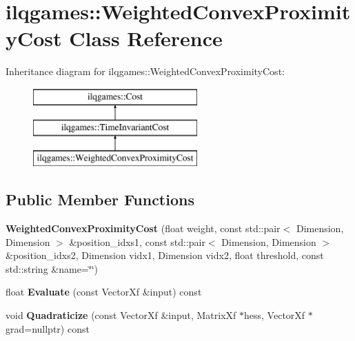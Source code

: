 \hypertarget{classilqgames_1_1_weighted_convex_proximity_cost}{}\section{ilqgames\+:\+:Weighted\+Convex\+Proximity\+Cost Class Reference}
\label{classilqgames_1_1_weighted_convex_proximity_cost}
Inheritance diagram for ilqgames\+:\+:Weighted\+Convex\+Proximity\+Cost\+:\begin{figure}[H]
\begin{center}
\leavevmode
\includegraphics[height=3.000000cm]{classilqgames_1_1_weighted_convex_proximity_cost}
\end{center}
\end{figure}
\subsection*{Public Member Functions}
\begin{DoxyCompactItemize}
\item 
{\bfseries Weighted\+Convex\+Proximity\+Cost} (float weight, const std\+::pair$<$ Dimension, Dimension $>$ \&position\+\_\+idxs1, const std\+::pair$<$ Dimension, Dimension $>$ \&position\+\_\+idxs2, Dimension vidx1, Dimension vidx2, float threshold, const std\+::string \&name=\char`\"{}\char`\"{})\hypertarget{classilqgames_1_1_weighted_convex_proximity_cost_a6833eb06aeaf101b1474d23fff00a2b9}{}\label{classilqgames_1_1_weighted_convex_proximity_cost_a6833eb06aeaf101b1474d23fff00a2b9}

\item 
float {\bfseries Evaluate} (const Vector\+Xf \&input) const \hypertarget{classilqgames_1_1_weighted_convex_proximity_cost_a55b07162c2cec9915842dbe558ebb772}{}\label{classilqgames_1_1_weighted_convex_proximity_cost_a55b07162c2cec9915842dbe558ebb772}

\item 
void {\bfseries Quadraticize} (const Vector\+Xf \&input, Matrix\+Xf $\ast$hess, Vector\+Xf $\ast$grad=nullptr) const \hypertarget{classilqgames_1_1_weighted_convex_proximity_cost_a2bd12fa5fbedcc8277bd082eda49b2ae}{}\label{classilqgames_1_1_weighted_convex_proximity_cost_a2bd12fa5fbedcc8277bd082eda49b2ae}

\end{DoxyCompactItemize}
